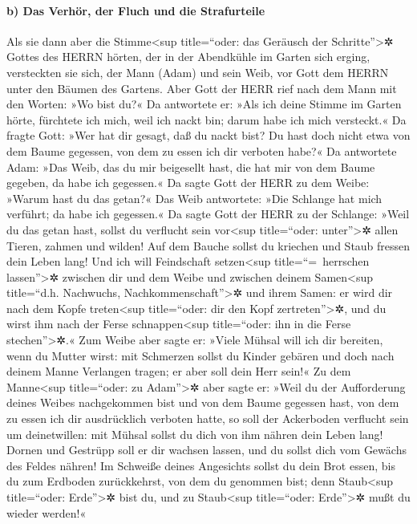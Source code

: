 \hypertarget{b-das-verhuxf6r-der-fluch-und-die-strafurteile}{%
\paragraph{b) Das Verhör, der Fluch und die
Strafurteile}\label{b-das-verhuxf6r-der-fluch-und-die-strafurteile}}

 Als sie dann aber die Stimme\textless sup title=``oder:
das Geräusch der Schritte''\textgreater✲ Gottes des HERRN hörten, der in
der Abendkühle im Garten sich erging, versteckten sie sich, der Mann
(Adam) und sein Weib, vor Gott dem HERRN unter den Bäumen des Gartens.
 Aber Gott der HERR rief nach dem Mann mit den Worten: »Wo
bist du?«  Da antwortete er: »Als ich deine Stimme im
Garten hörte, fürchtete ich mich, weil ich nackt bin; darum habe ich
mich versteckt.«  Da fragte Gott: »Wer hat dir gesagt,
daß du nackt bist? Du hast doch nicht etwa von dem Baume gegessen, von
dem zu essen ich dir verboten habe?«  Da antwortete Adam:
»Das Weib, das du mir beigesellt hast, die hat mir von dem Baume
gegeben, da habe ich gegessen.«  Da sagte Gott der HERR
zu dem Weibe: »Warum hast du das getan?« Das Weib antwortete: »Die
Schlange hat mich verführt; da habe ich gegessen.«  Da
sagte Gott der HERR zu der Schlange: »Weil du das getan hast, sollst du
verflucht sein vor\textless sup title=``oder: unter''\textgreater✲ allen
Tieren, zahmen und wilden! Auf dem Bauche sollst du kriechen und Staub
fressen dein Leben lang!  Und ich will Feindschaft
setzen\textless sup title=``=~herrschen lassen''\textgreater✲ zwischen
dir und dem Weibe und zwischen deinem Samen\textless sup title=``d.h.
Nachwuchs, Nachkommenschaft''\textgreater✲ und ihrem Samen: er wird dir
nach dem Kopfe treten\textless sup title=``oder: dir den Kopf
zertreten''\textgreater✲, und du wirst ihm nach der Ferse
schnappen\textless sup title=``oder: ihn in die Ferse
stechen''\textgreater✲.«  Zum Weibe aber sagte er: »Viele
Mühsal will ich dir bereiten, wenn du Mutter wirst: mit Schmerzen sollst
du Kinder gebären und doch nach deinem Manne Verlangen tragen; er aber
soll dein Herr sein!«  Zu dem Manne\textless sup
title=``oder: zu Adam''\textgreater✲ aber sagte er: »Weil du der
Aufforderung deines Weibes nachgekommen bist und von dem Baume gegessen
hast, von dem zu essen ich dir ausdrücklich verboten hatte, so soll der
Ackerboden verflucht sein um deinetwillen: mit Mühsal sollst du dich von
ihm nähren dein Leben lang!  Dornen und Gestrüpp soll er
dir wachsen lassen, und du sollst dich vom Gewächs des Feldes nähren!
 Im Schweiße deines Angesichts sollst du dein Brot essen,
bis du zum Erdboden zurückkehrst, von dem du genommen bist; denn
Staub\textless sup title=``oder: Erde''\textgreater✲ bist du, und zu
Staub\textless sup title=``oder: Erde''\textgreater✲ mußt du wieder
werden!«

